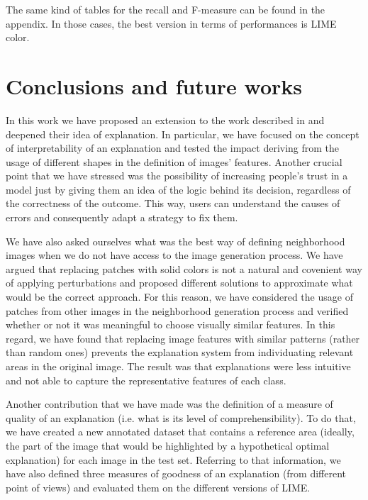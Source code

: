 \documentclass[12pt, twoside, a4paper]{report}
\begin{document}
The same kind of tables for the recall and F-measure can be found in the appendix. In those cases, the best version in terms of performances is LIME color.


\chapter{Conclusions and future works}\label{chapt:conclusions}

In this work we have proposed an extension to the work described in \cite{lime} and deepened their idea of explanation. In particular, we have focused on the concept of interpretability of an explanation and tested the impact deriving from the usage of different shapes in the definition of images' features. Another crucial point that we have stressed was the possibility of increasing people's trust in a model just by giving them an idea of the logic behind its decision, regardless of the correctness of the outcome. This way, users can understand the causes of errors and consequently adapt a strategy to fix them.

We have also asked ourselves what was the best way of defining neighborhood images when we do not have access to the image generation process. We have argued that replacing patches with solid colors is not a natural and covenient way of applying perturbations and proposed different solutions to approximate what would be the correct approach. For this reason, we have considered the usage of patches from other images in the neighborhood generation process and verified whether or not it was meaningful to choose visually similar features. In this regard, we have found that replacing image features with similar patterns (rather than random ones) prevents the explanation system from individuating relevant areas in the original image. The result was that explanations were less intuitive and not able to capture the representative features of each class. 

Another contribution that we have made was the definition of a measure of quality of an explanation (i.e. what is its level of comprehensibility). To do that, we have created a new annotated dataset that contains a reference area (ideally, the part of the image that would be highlighted by a hypothetical optimal explanation) for each image in the test set. Referring to that information, we have also defined three measures of goodness of an explanation (from different point of views) and evaluated them on the different versions of LIME.
\end{document}
